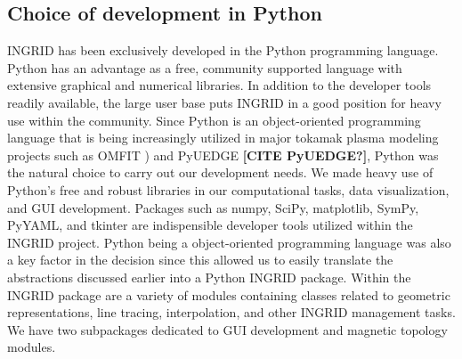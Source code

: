 \subsection{\label{sec:level2}Choice of development in Python}

INGRID has been exclusively developed in the Python programming
language. Python has an advantage as a free, community supported
language with extensive graphical and numerical libraries. In addition
to the developer tools readily available, the large user base puts
INGRID in a good position for heavy use within the community. Since
Python is an object-oriented programming language that is being
increasingly utilized in major tokamak plasma modeling projects such
as OMFIT \cite{Meneghini_2015, Orso_MENEGHINI2013}) and PyUEDGE
\textbf{[CITE PyUEDGE?]}, Python was the natural choice to carry out
our development needs. We made heavy use of Python's free and robust
libraries in our computational tasks, data visualization, and GUI
development. Packages such as numpy, SciPy, matplotlib, SymPy, PyYAML,
and tkinter are indispensible developer tools utilized within the
INGRID project\cite{numpy_5725236, virtanen2019scipy,
  matplotlib_4160265}. Python being a object-oriented programming
language was also a key factor in the decision since this allowed us
to easily translate the abstractions discussed earlier into a Python
INGRID package. Within the INGRID package are a variety of modules
containing classes related to geometric representations, line tracing,
interpolation, and other INGRID management tasks. We have two
subpackages dedicated to GUI development and magnetic topology
modules.
